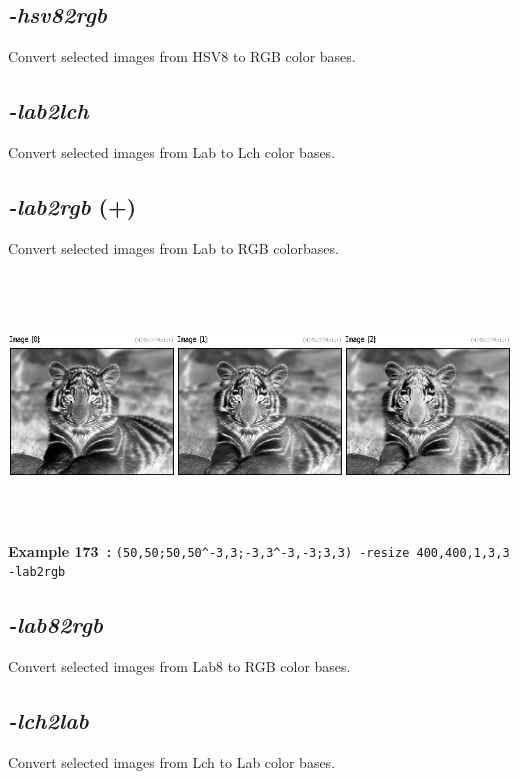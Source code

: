 \documentclass[a4paper,11pt,twoside]{book}
\begin{document}
\subsection{\emph{-hsv82rgb} }\vspace*{-0.5em}
Convert selected images from HSV8 to RGB color bases.


\subsection{\emph{-lab2lch} }\vspace*{-0.5em}
Convert selected images from Lab to Lch color bases.


\subsection{\emph{-lab2rgb} (+)}\vspace*{-0.5em}
Convert selected images from Lab to RGB colorbases.
\begin{center}\includegraphics[keepaspectratio=true,height=7cm,width=\textwidth]{img/gmic_def173.jpg}\\
{\footnotesize \textbf{Example 173~:} \texttt{(50,50;50,50\textasciicircum -3,3;-3,3\textasciicircum -3,-3;3,3) -resize 400,400,1,3,3 -lab2rgb}}
\end{center}

\subsection{\emph{-lab82rgb} }\vspace*{-0.5em}
Convert selected images from Lab8 to RGB color bases.


\subsection{\emph{-lch2lab} }\vspace*{-0.5em}
Convert selected images from Lch to Lab color bases.
\end{document}
